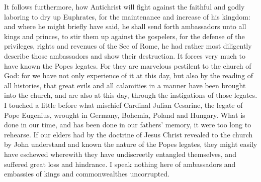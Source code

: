 It follows furthermore, how Antichrist will fight against the faithful and godly laboring to dry up Euphrates, for the maintenance and increase of his kingdom: and where he might briefly have said, he shall send forth ambassadors unto all kings and princes, to stir them up against the gospelers, for the defense of the privileges, rights and revenues of the See of Rome, he had rather most diligently describe those ambassadors and show their destruction. It forces very much to have known the Popes legates. For they are marvelous pestilent to the church of God: for we have not only experience of it at this day, but also by the reading of all histories, that great evils and all calamities in a manner have been brought into the church, and are also at this day, through the instigations of those legates. I touched a little before what mischief Cardinal Julian Cesarine, the legate of Pope Eugenius, wrought in Germany, Bohemia, Poland and Hungary. What is done in our time, and has been done in our fathers’ memory, it were too long to rehearse. If our elders had by the doctrine of Jesus Christ revealed to the church by John understand and known the nature of the Popes legates, they might easily have eschewed wherewith they have undiscreetly entangled themselves, and suffered great loss and hindrance. I speak nothing here of ambassadors and embassies of kings and commonwealthes uncorrupted.

